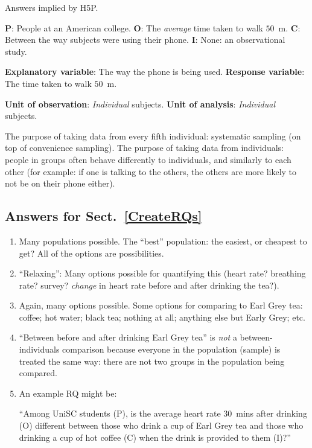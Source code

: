 \documentclass[
  11pt,
  a4paper,
  krantz2]{krantz}
\begin{document}
\begin{footnotesize}
Answers implied by H5P.

\textbf{P}: People at an American college.
\textbf{O}: The \emph{average} time taken to walk \(50\)~m.
\textbf{C}: Between the way subjects were using their phone.
\textbf{I}: None: an observational study.

\textbf{Explanatory variable}: The way the phone is being used.
\textbf{Response variable}: The time taken to walk \(50\)~m.

\textbf{Unit of observation}: \emph{Individual} subjects.
\textbf{Unit of analysis}: \emph{Individual} subjects.

The purpose of taking data from every fifth individual: systematic sampling (on top of convenience sampling).
The purpose of taking data from individuals: people in groups often behave differently to individuals, and similarly to each other (for example: if one is talking to the others, the others are more likely to not be on their phone either).

\subsection*{Answers for Sect.~\ref{CreateRQs}}\label{answers-for-sect.-refcreaterqs}

\begin{enumerate}
\def\labelenumi{\arabic{enumi}.}
\item
  Many populations possible. The ``best'' population: the easiest, or cheapest to get?
  All of the options are possibilities.
\item
  ``Relaxing'': Many options possible for quantifying this (heart rate? breathing rate? survey? \emph{change} in heart rate before and after drinking the tea?).
\item
  Again, many options possible. Some options for comparing to Earl Grey tea: coffee; hot water; black tea; nothing at all; anything else but Early Grey; etc.
\item
  ``Between before and after drinking Earl Grey tea'' is \emph{not} a between-individuals comparison because everyone in the population (sample) is treated the same way: there are not two groups in the population being compared.
\item
  An example RQ might be:

  ``Among UniSC students (P), is the average heart rate \(30\)~mins after drinking (O) different between those who drink a cup of Earl Grey tea and those who drinking a cup of hot coffee (C) when the drink is provided to them (I)?''


\end{enumerate}
\end{footnotesize}
\end{document}

